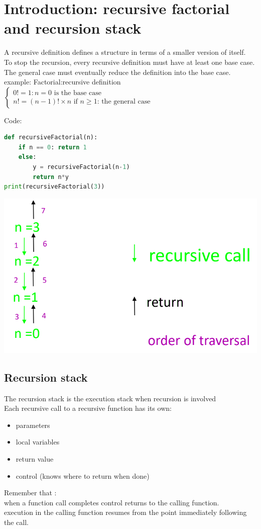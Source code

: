 \documentclass[12pt,oneside]{book}
\begin{document}
\section{Introduction: recursive factorial and recursion stack}
A recursive definition defines a structure in terms of a smaller version of itself.\\
To stop the recursion, every recursive definition must have at least one base case.\\
The general case must eventually reduce the definition into the base case.\\

example: Factorial:recursive definition $\begin{cases}
		0! = 1: n=0 \text{ is the base case} \\
		n! = (n-1)!\times n \text{ if } n \geq 1 \text{: the general case}
	\end{cases}$\\
\begin{minipage}{0.6\linewidth}
	Code:
	\begin{lstlisting}[language=python]
def recursiveFactorial(n):
    if n == 0: return 1
    else:
        y = recursiveFactorial(n-1)
        return n*y 
print(recursiveFactorial(3))
\end{lstlisting}
\end{minipage}
\begin{minipage}{0.3\linewidth}
	\includegraphics[width=\linewidth]{../pic/python/4}
\end{minipage}
\subsection{Recursion stack}
The recursion stack is the execution stack when recursion is involved \\
Each recursive call to a recursive function has its own:
\begin{itemize}
	\item parameters
	\item local variables
	\item return value
	\item control (knows where to return when done)
\end{itemize}
Remember that :\\
when a function call completes control returns to the calling function.\\
execution in the calling function resumes from the point immediately following the call.
\pagebreak
\end{document}
